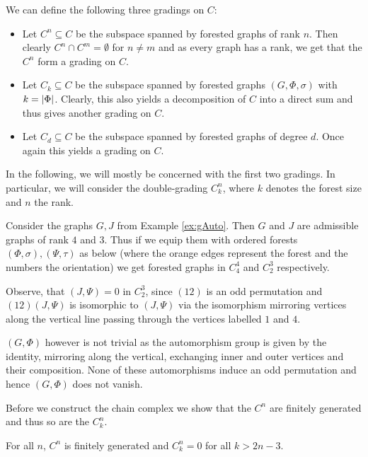 We can define the following three gradings on $C$:
 \begin{itemize}
	\item Let $C^{n} \subseteq C$ be the subspace spanned by forested graphs of rank $n$. Then clearly  $C^{n} \cap C^{m} = \emptyset$ for $n \neq m$ and
		as every graph has a rank, we get that the $C^{n}$ form a grading on $C$.
	\item Let $C_{k} \subseteq C$ be the subspace spanned by forested graphs $(G,\Phi,\sigma)$ with $k = \abs{\Phi}$. Clearly, this also yields a decomposition of $C$ into a direct sum
		and thus gives another grading on $C$.
	\item Let  $C_{d} \subseteq C$ be the subspace spanned by forested graphs of degree $d$. Once again this yields a grading on $C$.
\end{itemize}
In the following, we will mostly be concerned with the first two gradings. In particular, we will consider the double-grading $C_{k}^{n}$,
where $k$ denotes the forest size and $n$ the rank. 

\begin{eg}\label{ex:fg}
	Consider the graphs $G, J$ from Example \ref{ex:gAuto}. Then $G$ and $J$ are admissible graphs of rank $4$ and $3$. Thus if we equip them with ordered forests 
	$(\Phi,\sigma), (\Psi,\tau)$ as below 
	(where the orange edges represent the forest and the numbers the orientation) we get forested graphs in $C^{4}_{4}$ and $C^{3}_{2}$ respectively.


	Observe, that $(J,\Psi) = 0$ in $C_{2}^{3}$, since $ (1 2)$ is an odd permutation and  $(1 2) (J,\Psi)$ is isomorphic to $(J,\Psi)$ 
	via the isomorphism mirroring vertices along the vertical line passing through the vertices labelled $1$ and $4$.

	$(G,\Phi)$ however is not trivial as the automorphism group is given by the identity,
	mirroring along the vertical, exchanging inner and outer vertices and their composition.
	None of these automorphisms induce an odd permutation and hence $(G,\Phi)$ does not vanish.
\end{eg}

Before we construct the chain complex we show that the $C^{n}$ are finitely generated and thus so are the $C_{k}^{n}$.

\begin{theorem}\label{thm:finGenCn}
	For all $n$, $C^{n}$ is finitely generated and $C_{k}^{n} = 0$ for all $k > 2n-3$. 
\end{theorem}


